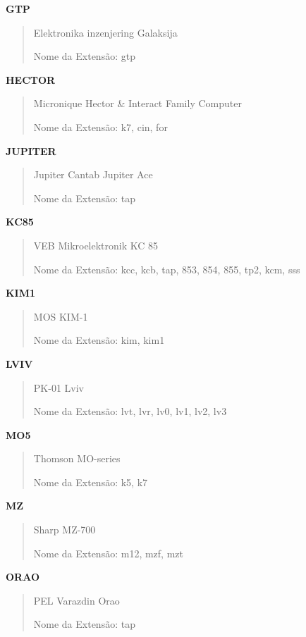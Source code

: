 \documentclass[letterpaper,10pt,brazil]{sphinxmanual}
\begin{document}
\textbf{GTP}
\begin{quote}

Elektronika inzenjering Galaksija

Nome da Extensão: gtp
\end{quote}

\textbf{HECTOR}
\begin{quote}

Micronique Hector \& Interact Family Computer

Nome da Extensão: k7, cin, for
\end{quote}

\textbf{JUPITER}
\begin{quote}

Jupiter Cantab Jupiter Ace

Nome da Extensão: tap
\end{quote}

\textbf{KC85}
\begin{quote}

VEB Mikroelektronik KC 85

Nome da Extensão: kcc, kcb, tap, 853, 854, 855, tp2, kcm, sss
\end{quote}

\textbf{KIM1}
\begin{quote}

MOS KIM-1

Nome da Extensão: kim, kim1
\end{quote}

\textbf{LVIV}
\begin{quote}

PK-01 Lviv

Nome da Extensão: lvt, lvr, lv0, lv1, lv2, lv3
\end{quote}

\textbf{MO5}
\begin{quote}

Thomson MO-series

Nome da Extensão: k5, k7
\end{quote}

\textbf{MZ}
\begin{quote}

Sharp MZ-700

Nome da Extensão: m12, mzf, mzt
\end{quote}

\textbf{ORAO}
\begin{quote}

PEL Varazdin Orao

Nome da Extensão: tap
\end{quote}
\end{document}
